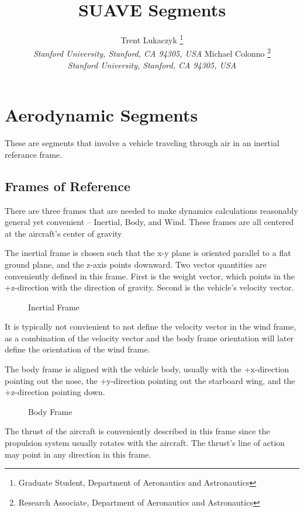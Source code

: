 \documentclass{article}
\title{SUAVE Segments}
\author{
  Trent Lukaczyk%
        \thanks{Graduate Student, Department of Aeronautics and Astronautics} \\
  {\normalsize\itshape Stanford University, Stanford, CA 94305, USA}
  Michael Colonno%
        \thanks{Research Associate, Department of Aeronautics and Astronautics} \\
  {\normalsize\itshape Stanford University, Stanford, CA 94305, USA}
}
\begin{document}
\maketitle

\clearpage

\section{Aerodynamic Segments}

These are segments that involve a vehicle traveling through air in an inertial referance frame.  


\subsection{Frames of Reference}

There are three frames that are needed to make dynamics calculations reasonably general yet convenient -- Inertial, Body, and Wind.  These frames are all centered at the aircraft's center of gravity

The inertial frame is chosen such that the x-y plane is oriented parallel to a flat ground plane, and the z-axis points downward.  Two vector quantities are conveniently defined in this frame.  First is the weight vector, which points in the +z-direction with the direction of gravity.  Second is the vehicle's velocity vector.  

\begin{figure}[htb] 
    \centering
    \def\svgwidth{150pt}
    
    \caption{Inertial Frame}
\end{figure} 

It is typically not convienient to not define the velocity vector in the wind frame, as a combination of the velocity vector and the body frame orientation will later define the orientation of the wind frame.

The body frame is aligned with the vehicle body, usually with the +x-direction pointing out the nose, the +y-direction pointing out the starboard wing, and the +z-direction pointing down.  

\begin{figure}[htb] 
    \centering
    \def\svgwidth{150pt}
    
    \caption{Body Frame}
\end{figure} 

The thrust of the aircraft is conveniently described in this frame since the propulsion system usually rotates with the aircraft.  The thrust's line of action may point in any direction in this frame.
\end{document}
